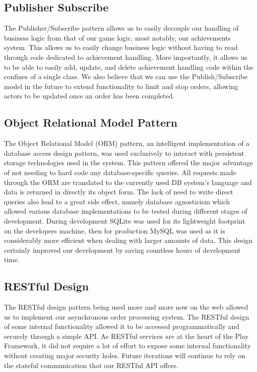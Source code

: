 \subsection{Publisher Subscribe}
The Publisher/Subscribe pattern allows us to easily decouple our handling of
business logic from that of our game logic, most notably, our achievements
system. This allows us to easily change business logic without having to read
through code dedicated to achievement handling. More importantly, it allows us
to be able to easily add, update, and delete achievement handling code within the
confines of a single class. We also believe that we can use the
Publish/Subscribe model in the future to extend functionality to limit and stop
orders, allowing actors to be updated once an order has been completed.
\subsection{Object Relational Model Pattern}
The Object Relational Model (ORM) pattern, an intelligent implementation of a
database access design pattern, was used exclusively to interact with
persistent storage technologies used in the system. This pattern offered the
major advantage of not needing to hard code any database-specific queries. All
requests made through the ORM are translated to the currently used DB system's
language and data is returned in directly its object form. The lack of need to
write direct queries also lead to a great side effect, namely database
agnosticism which allowed various database implementations to be tested during
different stages of development. During development SQLite was used for its
lightweight footprint on the developers machine, then for production MySQL was
used as it is considerably more efficient when dealing with larger amounts of
data. This design certainly improved our development by saving countless hours
of development time.
\subsection{RESTful Design}
The RESTful design pattern being used more and more now on the web allowed us to
implement our asynchronous order processing system. The RESTful design of some
internal functionality allowed it to be accessed programmatically and securely
through a simple API. As RESTful services are at the heart of the Play
Framework, it did not require a lot of effort to expose some internal
functionality without creating major security holes. Future iterations will
continue to rely on the stateful communication that our RESTful API offers.
